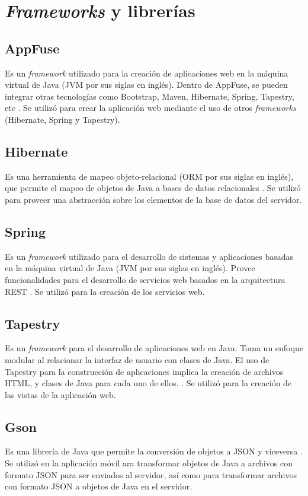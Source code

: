 \section{\textit{Frameworks} y librerías} \label{Frameworks y librerias}

\subsection{AppFuse}
Es un \textit{framework} utilizado para la creación de aplicaciones web en la máquina virtual de Java (JVM por sus siglas en inglés). Dentro de AppFuse, se pueden integrar otras tecnologías como Bootstrap, Maven, Hibernate, Spring, Tapestry, etc \cite{APF1}. Se utilizó para crear la aplicación web mediante el uso de otros \textit{frameworks} (Hibernate, Spring y Tapestry).

\subsection{Hibernate}
Es una herramienta de mapeo objeto-relacional (ORM por sus siglas en inglés), que permite el mapeo de objetos de Java a bases de datos relacionales \cite{HBR1}. Se utilizó para proveer una abstracción sobre los elementos de la base de datos del servidor.

\subsection{Spring}
Es un \textit{framework} utilizado para el desarrollo de sistemas y aplicaciones basadas en la máquina virtual de Java (JVM por sus siglas en inglés). Provee funcionalidades para el desarrollo de servicios web basados en la arquitectura REST \cite{SPRNG0}. Se utilizó para la creación de los servicios web.

\subsection{Tapestry}
Es un \textit{framework} para el desarrollo de aplicaciones web en Java. Toma un enfoque modular al relacionar la interfaz de usuario con clases de Java. El uso de Tapestry para la construcción de aplicaciones implica la creación de archivos HTML, y clases de Java para cada uno de ellos. \cite{ATP1}. Se utilizó para la creación de las vistas de la aplicación web.

\subsection{Gson}
Es una librería de Java que permite la conversión de objetos a JSON y viceversa \cite{GSN1}. Se utilizó en la aplicación móvil ara transformar objetos de Java a archivos con formato JSON para ser enviados al servidor, así como para transformar archivos con formato JSON a objetos de Java en el servidor.

